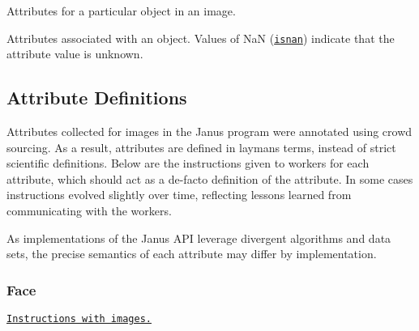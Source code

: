 Attributes for a particular object in an image. 

Attributes associated with an object. Values of {\ttfamily Na\+N} (\href{http://www.cplusplus.com/reference/cmath/isnan/}{\tt isnan}) indicate that the attribute value is unknown.\hypertarget{group__janus_attribute_definitions}{}\subsection{Attribute Definitions}\label{group__janus_attribute_definitions}
Attributes collected for images in the Janus program were annotated using crowd sourcing. As a result, attributes are defined in layman\textquotesingle{}s terms, instead of strict scientific definitions. Below are the instructions given to workers for each attribute, which should act as a de-\/facto definition of the attribute. In some cases instructions evolved slightly over time, reflecting lessons learned from communicating with the workers.

As implementations of the Janus A\+P\+I leverage divergent algorithms and data sets, the precise semantics of each attribute may differ by implementation.\hypertarget{group__janus_face}{}\subsubsection{Face}\label{group__janus_face}
\href{https://s3.amazonaws.com/TurkAnnotator/boundingboxesinstructions.html}{\tt Instructions with images.}

